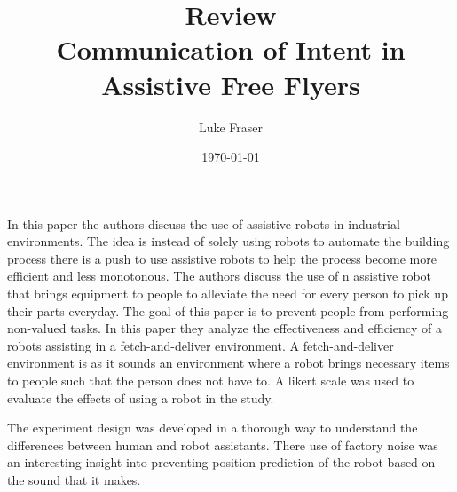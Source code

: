 \documentclass{article}
\begin{document}
\title{{\large Review} \\ Communication of Intent in Assistive Free Flyers}
\author{Luke Fraser}
\date{\today}
\maketitle

\begingroup
\renewcommand{\section}[2]{}


\endgroup

\section*{Summary}
In this paper the authors discuss the use of assistive robots in industrial environments. The idea is instead of solely using robots to automate the building process there is a push to use assistive robots to help the process become more efficient and less monotonous. The authors discuss the use of n assistive robot that brings equipment to people to alleviate the need for every person to pick up their parts everyday. The goal of this paper is to prevent people from performing non-valued tasks. In this paper they analyze the effectiveness and efficiency of a robots assisting in a fetch-and-deliver environment. A fetch-and-deliver environment is as it sounds an environment where a robot brings necessary items to people such that the person does not have to. A likert scale was used to evaluate the effects of using a robot in the study.
\section*{Strengths}
The experiment design was developed in a thorough way to understand the differences between human and robot assistants. There use of factory noise was an interesting insight into preventing position prediction of the robot based on the sound that it makes.
\end{document}
